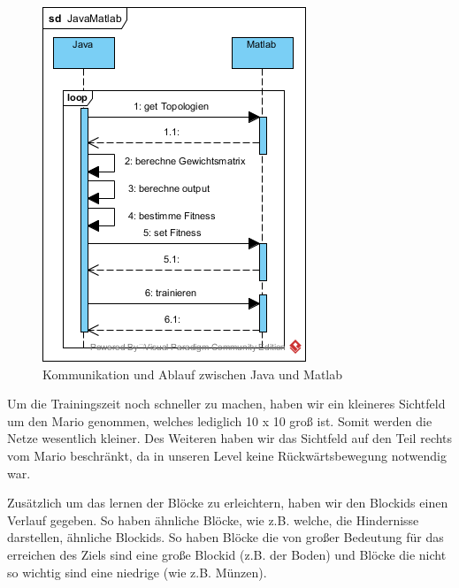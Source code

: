 \documentclass{hbrs-ecta-report}
\begin{document}
\begin{figure}[h!]
	\centering
	\includegraphics[width=\linewidth]{img/JavaMatlab.png}
	\caption{Kommunikation und Ablauf zwischen Java und Matlab}
	\label{fig:sequenzdiagramm} 
\end{figure}

Um die Trainingszeit noch schneller zu machen, haben wir ein kleineres Sichtfeld um den Mario genommen, welches lediglich 10 x 10 groß ist. Somit werden die Netze wesentlich kleiner. Des Weiteren haben wir das Sichtfeld auf den Teil rechts vom Mario beschränkt, da in unseren Level keine Rückwärtsbewegung notwendig war.

Zusätzlich um das lernen der Blöcke zu erleichtern, haben wir den Blockids einen Verlauf gegeben. So haben ähnliche Blöcke, wie z.B. welche, die  Hindernisse darstellen, ähnliche Blockids. So haben Blöcke die von großer Bedeutung für das erreichen des Ziels sind eine große Blockid (z.B. der Boden) und Blöcke die nicht so wichtig sind eine niedrige (wie z.B. Münzen).
\end{document}
